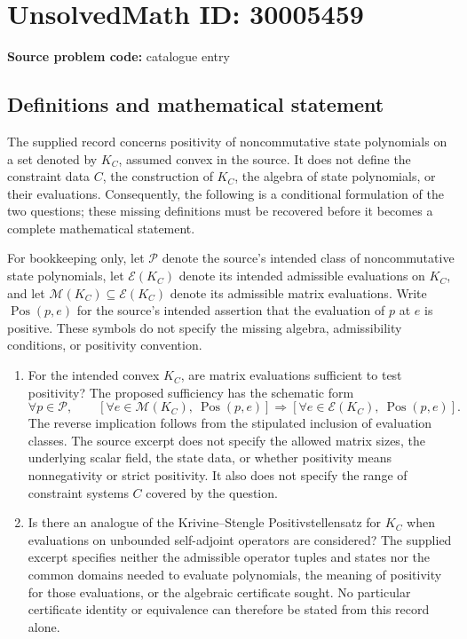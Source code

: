 \documentclass[11pt]{article}
\begin{document}
\section*{UnsolvedMath ID: 30005459}
\textbf{Source problem code:} catalogue entry
\subsection{Definitions and mathematical statement}
The supplied record concerns positivity of noncommutative state polynomials on a set denoted by \(K_C\), assumed convex in the source. It does not define the constraint data \(C\), the construction of \(K_C\), the algebra of state polynomials, or their evaluations. Consequently, the following is a conditional formulation of the two questions; these missing definitions must be recovered before it becomes a complete mathematical statement.

For bookkeeping only, let \(\mathcal P\) denote the source's intended class of noncommutative state polynomials, let \(\mathcal E(K_C)\) denote its intended admissible evaluations on \(K_C\), and let \(\mathcal M(K_C)\subseteq\mathcal E(K_C)\) denote its admissible matrix evaluations. Write \(\operatorname{Pos}(p,e)\) for the source's intended assertion that the evaluation of \(p\) at \(e\) is positive. These symbols do not specify the missing algebra, admissibility conditions, or positivity convention.

\begin{enumerate}
\item For the intended convex \(K_C\), are matrix evaluations sufficient to test positivity? The proposed sufficiency has the schematic form
\[
\forall p\in\mathcal P,\qquad
\left[\forall e\in\mathcal M(K_C),\ \operatorname{Pos}(p,e)\right]
\Longrightarrow
\left[\forall e\in\mathcal E(K_C),\ \operatorname{Pos}(p,e)\right].
\]
The reverse implication follows from the stipulated inclusion of evaluation classes. The source excerpt does not specify the allowed matrix sizes, the underlying scalar field, the state data, or whether positivity means nonnegativity or strict positivity. It also does not specify the range of constraint systems \(C\) covered by the question.
\item Is there an analogue of the Krivine--Stengle Positivstellensatz for \(K_C\) when evaluations on unbounded self-adjoint operators are considered? The supplied excerpt specifies neither the admissible operator tuples and states nor the common domains needed to evaluate polynomials, the meaning of positivity for those evaluations, or the algebraic certificate sought. No particular certificate identity or equivalence can therefore be stated from this record alone.
\end{enumerate}
\end{document}
